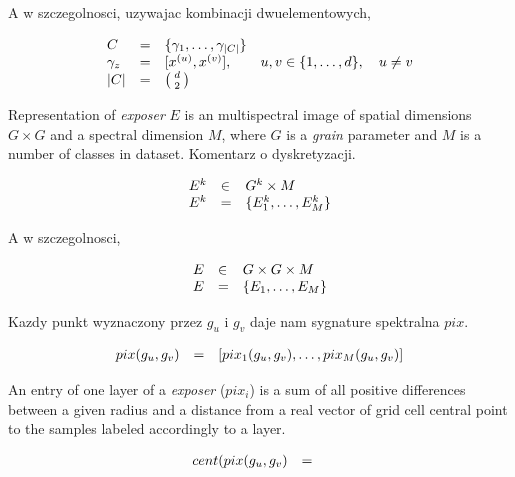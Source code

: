 \documentclass[]{article}
\begin{document}
A w szczegolnosci, uzywajac kombinacji dwuelementowych,

\begin{equation}
	\begin{array}[b]{llll}
		C & = & \{\gamma_1, \ldots, \gamma_{|C|} \}\\
		\gamma_z & = & [x^{(u)}, x^{(v)}], & u, v \in \{1, \ldots, d\},\quad u\neq v\\
		|C| & = & {\;d\;\choose \;2\;}
	\end{array}
\end{equation}

Representation of \emph{exposer} $E$ is an multispectral image of spatial dimensions $G\times G$ and a spectral dimension $M$, where $G$ is a \emph{grain} parameter and $M$ is a number of classes in dataset. Komentarz o dyskretyzacji.

\begin{equation}
	\begin{array}[b]{lll}
		E^k & \in & G^k \times M\\
		E^k & = & \{ E^k_1, \ldots, E^k_M \}
	\end{array}
\end{equation}

A w szczegolnosci,

\begin{equation}
	\begin{array}[b]{lll}
		E & \in & G \times G \times M\\
		E & = & \{ E_1, \ldots, E_M \}\\
	\end{array}
\end{equation}

Kazdy punkt wyznaczony przez $g_u$ i $g_v$ daje nam sygnature spektralna $pix$.

\begin{equation}
	\begin{array}[b]{lll}
		pix(g_u,g_v) &=& [pix_1(g_u,g_v), \ldots, pix_M(g_u,g_v)]
	\end{array}
\end{equation}

An entry of one layer of a \emph{exposer} ($pix_i$) is a sum of all positive differences between a given radius and a distance from a real vector of grid cell central point to the samples labeled accordingly to a layer. 

\begin{equation}
	\begin{array}[b]{lll}
		cent(pix(g_u,g_v) &=& 
	\end{array}
\end{equation}
\end{document}
